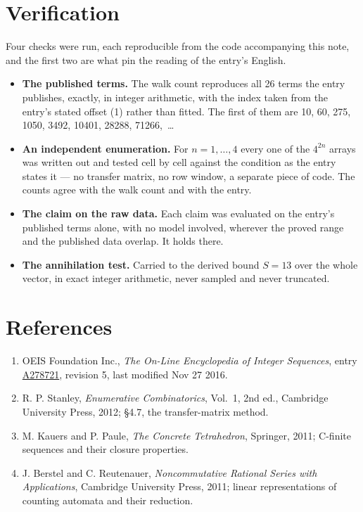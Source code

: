 \documentclass[11pt]{article}
\theoremstyle{definition}
\begin{document}
\section{Verification}

Four checks were run, each reproducible from the code accompanying this note, and the first two are what pin the reading of the entry's English.

\begin{itemize}

\item {\bfseries The published terms.} The walk count reproduces all 26 terms the entry publishes, exactly, in integer arithmetic, with the index taken from the entry's stated offset (1) rather than fitted. The first of them are 10, 60, 275, 1050, 3492, 10401, 28288, 71266,~\dots

\item {\bfseries An independent enumeration.} For $n = 1,\dots,4$ every one of the $4^{2n}$ arrays was written out and tested cell by cell against the condition as the entry states it --- no transfer matrix, no row window, a separate piece of code. The counts agree with the walk count and with the entry.

\item {\bfseries The claim on the raw data.} Each claim was evaluated on the entry's published terms alone, with no model involved, wherever the proved range and the published data overlap. It holds there.

\item {\bfseries The annihilation test.} Carried to the derived bound $S = 13$ over the whole vector, in exact integer arithmetic, never sampled and never truncated.

\end{itemize}

\section{References}

\begin{enumerate}

\item OEIS Foundation Inc., \emph{The On-Line Encyclopedia of Integer Sequences}, entry \href{https://oeis.org/A278721}{A278721}, revision 5, last modified Nov 27 2016.

\item R. P. Stanley, \emph{Enumerative Combinatorics}, Vol.~1, 2nd ed., Cambridge University Press, 2012; \S4.7, the transfer-matrix method.

\item M. Kauers and P. Paule, \emph{The Concrete Tetrahedron}, Springer, 2011; C-finite sequences and their closure properties.

\item J. Berstel and C. Reutenauer, \emph{Noncommutative Rational Series with Applications}, Cambridge University Press, 2011; linear representations of counting automata and their reduction.

\end{enumerate}
\end{document}
